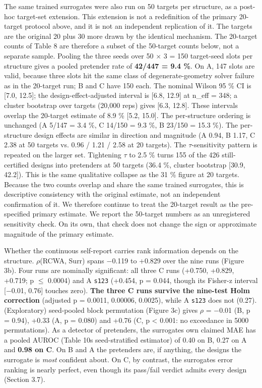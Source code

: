 \documentclass[11pt,a4paper]{article}
\begin{document}
The same trained surrogates were also run on 50 targets per structure, as a post-hoc
target-set extension. This extension is not a redefinition of the primary 20-target
protocol above, and it is not an independent replication of it. The targets are the
original 20 plus 30 more drawn by the identical mechanism. The 20-target counts of Table 8
are therefore a subset of the 50-target counts below, not a separate sample. Pooling the
three seeds over 50 \ensuremath{\times} 3 = 150 target-seed slots per structure gives a pooled pretender
rate of \textbf{42/447 = 9.4 \%}. On A, 147 slots are valid, because three slots hit the same
class of degenerate-geometry solver failure as in the 20-target run; B and C have 150
each. The nominal Wilson 95 \% CI is {[}7.0, 12.5{]}; the design-effect-adjusted interval is
{[}6.8, 12.9{]} at n\_eff = 348; a cluster bootstrap over targets (20,000 reps) gives
{[}6.3, 12.8{]}. These intervals overlap the 20-target estimate of 8.9 \% {[}5.2, 15.0{]}. The
per-structure ordering is unchanged
(A 5/147 = 3.4 \%, C 14/150 = 9.3 \%, B 23/150 = 15.3 \%). The per-structure design effects
are similar in direction and magnitude (A 0.94, B 1.17, C 2.38 at 50 targets vs.
0.96 / 1.21 / 2.58 at 20 targets). The \ensuremath{\tau}-sensitivity pattern is repeated on the larger
set. Tightening \ensuremath{\tau} to 2.5 \% turns 155 of the 426 still-certified designs into pretenders at
50 targets (36.4 \%, cluster bootstrap {[}30.9, 42.2{]}). This is the same qualitative collapse
as the 31 \% figure at 20 targets. Because the two counts overlap and share the same
trained surrogates, this is descriptive consistency with the original estimate, not an
independent confirmation of it. We therefore continue to treat the 20-target result as the
pre-specified primary estimate. We report the 50-target numbers as an unregistered
sensitivity check. On its own, that check does not change the sign or approximate
magnitude of the primary estimate.

Whether the continuous self-report carries rank information depends on the structure.
\ensuremath{\rho}(RCWA, Surr) spans \ensuremath{-}0.119 to +0.829 over the nine runs (Figure 3b). Four runs are nominally significant: all three C runs (+0.750, +0.829, +0.719; p \ensuremath{\leq} 0.0004) and A \texttt{s123}
(+0.454, p = 0.044, though its Fisher-z interval {[}\ensuremath{-}0.01, 0.76{]} touches zero). \textbf{The three
C runs survive the nine-test Holm correction} (adjusted p = 0.0011, 0.00006, 0.0025),
while A \texttt{s123} does not (0.27). (Exploratory) seed-pooled block permutation (Figure 3c) gives
\ensuremath{\rho} = \ensuremath{-}0.01 (B, p = 0.94), +0.33 (A, p = 0.080) and +0.76 (C, p \textless{} 0.001: no exceedance in
5000 permutations). As a detector of pretenders, the surrogate\textquotesingle s own claimed MAE has a
pooled AUROC (Table 10\textquotesingle s seed-stratified estimator) of 0.40 on B, 0.27 on A and \textbf{0.98 on
C}. On B and A the pretenders are, if anything, the designs the surrogate is \emph{most}
confident about. On C, by contrast, the surrogate\textquotesingle s error ranking is nearly perfect, even
though its pass/fail verdict admits every design (Section 3.7).
\end{document}
